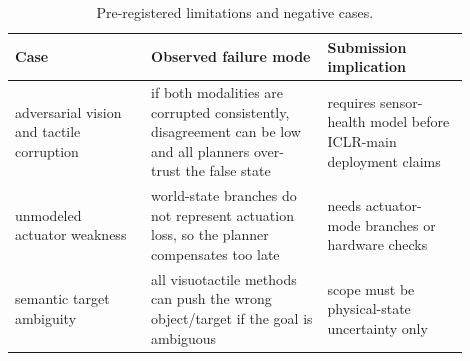 \begin{table}[t]
\centering
\caption{Pre-registered limitations and negative cases.}
\label{tab:negative-cases}
\small
\begin{tabular}{p{0.27\linewidth}p{0.35\linewidth}p{0.28\linewidth}}
\toprule
Case & Observed failure mode & Submission implication \\
\midrule
adversarial vision and tactile corruption & if both modalities are corrupted consistently, disagreement can be low and all planners over-trust the false state & requires sensor-health model before ICLR-main deployment claims \\
unmodeled actuator weakness & world-state branches do not represent actuation loss, so the planner compensates too late & needs actuator-mode branches or hardware checks \\
semantic target ambiguity & all visuotactile methods can push the wrong object/target if the goal is ambiguous & scope must be physical-state uncertainty only \\
\bottomrule
\end{tabular}
\end{table}
